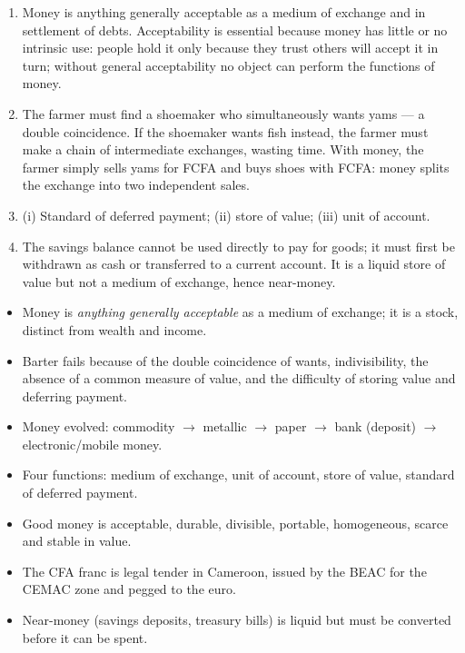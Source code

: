 \documentclass[11pt]{article}
\begin{document}
\begin{corrige}[Exercise 1]
\begin{enumerate}
\item Money is anything generally acceptable as a medium of exchange and in settlement of debts. Acceptability is essential because money has little or no intrinsic use: people hold it only because they trust others will accept it in turn; without general acceptability no object can perform the functions of money.
\item The farmer must find a shoemaker who simultaneously wants yams --- a double coincidence. If the shoemaker wants fish instead, the farmer must make a chain of intermediate exchanges, wasting time. With money, the farmer simply sells yams for FCFA and buys shoes with FCFA: money splits the exchange into two independent sales.
\item (i) Standard of deferred payment; (ii) store of value; (iii) unit of account.
\item The savings balance cannot be used directly to pay for goods; it must first be withdrawn as cash or transferred to a current account. It is a liquid store of value but not a medium of exchange, hence near-money.
\end{enumerate}
\end{corrige}

\begin{aretenir}
\begin{itemize}
\item Money is \emph{anything generally acceptable} as a medium of exchange; it is a stock, distinct from wealth and income.
\item Barter fails because of the double coincidence of wants, indivisibility, the absence of a common measure of value, and the difficulty of storing value and deferring payment.
\item Money evolved: commodity $\rightarrow$ metallic $\rightarrow$ paper $\rightarrow$ bank (deposit) $\rightarrow$ electronic/mobile money.
\item Four functions: medium of exchange, unit of account, store of value, standard of deferred payment.
\item Good money is acceptable, durable, divisible, portable, homogeneous, scarce and stable in value.
\item The CFA franc is legal tender in Cameroon, issued by the BEAC for the CEMAC zone and pegged to the euro.
\item Near-money (savings deposits, treasury bills) is liquid but must be converted before it can be spent.
\end{itemize}
\end{aretenir}
\end{document}
